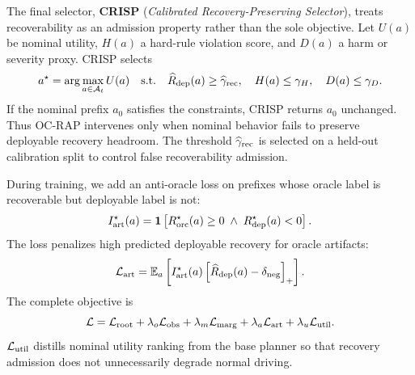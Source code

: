 \documentclass[conference]{IEEEtran}
\begin{document}
The final selector, \textbf{CRISP} (\emph{Calibrated Recovery-Preserving Selector}), treats recoverability as an admission property rather than the sole objective.  Let $U(a)$ be nominal utility, $H(a)$ a hard-rule violation score, and $D(a)$ a harm or severity proxy.  CRISP selects
\begin{equation}
    a^\star
    =
    \arg\max_{a\in \mathcal{A}_t}
    U(a)
    \quad
    \mathrm{s.t.}
    \quad
    \widehat R_{\rm dep}(a)\geq \widehat\gamma_{\rm rec},
    \quad
    H(a)\leq \gamma_H,
    \quad
    D(a)\leq \gamma_D.
    \label{eq:crisp}
\end{equation}
If the nominal prefix $a_0$ satisfies the constraints, CRISP returns $a_0$ unchanged.  Thus OC-RAP intervenes only when nominal behavior fails to preserve deployable recovery headroom.  The threshold $\widehat\gamma_{\rm rec}$ is selected on a held-out calibration split to control false recoverability admission.

During training, we add an anti-oracle loss on prefixes whose oracle label is recoverable but deployable label is not:
\begin{equation}
    I_{\rm art}^{\star}(a)
    =
    \mathbf{1}
    \left[
        R_{\rm orc}^{\star}(a)\geq 0
        \;\wedge\;
        R_{\rm dep}^{\star}(a)<0
    \right].
    \label{eq:artifact_indicator}
\end{equation}
The loss penalizes high predicted deployable recovery for oracle artifacts:
\begin{equation}
    \mathcal{L}_{\rm art}
    =
    \mathbb{E}_{a}
    \left[
        I_{\rm art}^{\star}(a)
        \left[
            \widehat R_{\rm dep}(a)-\delta_{\rm neg}
        \right]_+
    \right].
    \label{eq:anti_oracle_loss}
\end{equation}
The complete objective is
\begin{equation}
    \mathcal{L}
    =
    \mathcal{L}_{\rm root}
    +
    \lambda_o \mathcal{L}_{\rm obs}
    +
    \lambda_m \mathcal{L}_{\rm marg}
    +
    \lambda_a \mathcal{L}_{\rm art}
    +
    \lambda_u \mathcal{L}_{\rm util}.
    \label{eq:total_loss}
\end{equation}
$\mathcal{L}_{\rm util}$ distills nominal utility ranking from the base planner so that recovery admission does not unnecessarily degrade normal driving.
\end{document}
